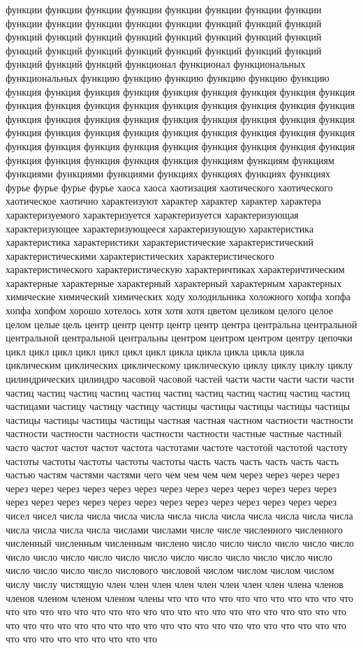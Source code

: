 функции функции функции функции функции функции функции функции функции функции функции функции функции функций функций функций функций функций функций функций функций функций функций функций функций функций функций функций функций функций функций функций функций функций функций функционал функционал функциональных функциональных функцию функцию функцию функцию функцию функцию функция функция функция функция функция функция функция функция функция функция функция функция функция функция функция функция функция функция функция функция функция функция функция функция функция функция функция функция функция функция функция функция функция функция функция функция функция функция функция функция функция функция функция функция функция функция функция функция функция функция функциям функциям функциям функциями функциями функциями функциях функциях функциях функциях фурье фурье фурье фурье хаоса хаоса хаотизация хаотического хаотического хаотическое хаотично характеизуют характер характер характер характера характеризуемого характеризуется характеризуется характеризующая характеризующее характеризующееся характеризующую характеристика характеристика характеристики характеристические характеристический характеристическими характеристических характеристического характеристического характеристическую характеричтиках характеричтическим характерные характерные характерный характерный характерным характерных химические химический химических ходу холодильника холожного хопфа хопфа хопфа хопфом хорошо хотелось хотя хотя хотя цветом целиком целого целое целом целые цель центр центр центр центр центр центра центральна центральной центральной центральной центральны центром центром центром центру цепочки цикл цикл цикл цикл цикл цикл цикл цикла цикла цикла цикла цикла циклическим циклических циклическому циклическую циклу циклу циклу циклу цилиндрических цилиндро часовой часовой частей части части части части части частиц частиц частиц частиц частиц частиц частиц частиц частиц частиц частиц частицами частицу частицу частицу частицы частицы частицы частицы частицы частицы частицы частицы частицы частная частная частном частности частности частности частности частности частности частности частные частные частный часто частот частот частот частота частотами частоте частотой частотой частоту частоты частоты частоты частоты частоты часть часть часть часть часть часть частью частям частями частями чего чем чем чем чем через через через через через через через через через через через через через через через через через через через через через через через через через через через через через через чисел чисел числа числа числа числа числа числа числа числа числа числа числа числа числа числа числа числами числами числе числе численного численного численный численным численным числено число число число число число число число число число число число число число число число число число число число число число число числового числовой числом числом числом числом числу числу чистящую член член член член член член член член члена членов членов членом членом членом члены что что что что что что что что что что что что что что что что что что что что что что что что что что что что что что что что что что что что что что что что что что что что что что что что что что что что что что что что что что что что 